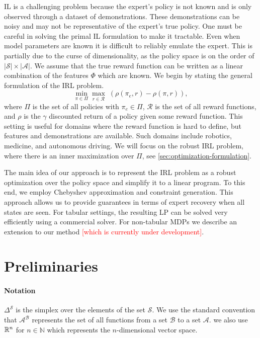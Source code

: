 \documentclass[11pt]{uai2023}
\newcommand{\gersi}[1]{\textcolor{red}{[#1]}}
\begin{document}
IL is a challenging problem because the expert's policy is not known and is only observed through a dataset of demonstrations. 
These demonstrations can be noisy and may not be representative of the expert's true policy. One must be careful in solving the 
primal IL formulation to make it tractable. Even when model parameters are known it is difficult to reliably emulate the expert. 
This is partially due to the curse of dimensionality, as the policy space is on the order of $|\mathcal{S}|\times |\mathcal{A}|$.
We assume that the true reward function can be written as a linear combination of the features $\Phi$ which are known.
We begin by stating the general formulation of the IRL problem.
\begin{equation} \label{eq:IRL_formulation}
	\min_{\pi \in \Pi} \max_{r \in \mathcal{R}} \; (\rho(\pi_e, r) - \rho(\pi, r)),
\end{equation}
where $\Pi$ is the set of all policies with $\pi_e \in \Pi$, $\mathcal{R}$ is the set of all reward functions, and $\rho$ is the $\gamma$ discounted 
return of a policy given some reward function. This setting is useful for domains where the reward function is hard to define, 
but features and demonstrations are available. Such domains include robotics, medicine, and autonomous driving. 
We will focus on the robust IRL problem, where there is an inner maximization over $\Pi$, see \cref{sec:optimization-formulation}.

The main idea of our approach is to represent the IRL problem as a robust optimization over the policy space and simplify it to a linear program. 
To this end, we employ Chebyshev approximation and constraint generation. This approach allows us to provide guarantees in terms of expert recovery when all states are seen.
For tabular settings, the resulting LP can be solved very efficiently using a commercial solver. 
For non-tabular MDPs we describe an extension to our method \gersi{which is currently under development}.

\section{Preliminaries}\label{sec:preliminaries}

\paragraph{Notation} $\Delta^{\mathcal{S}}$ is the simplex over the elements of the set $\mathcal{S}$. We use the standard convention that $\mathcal{A}^{\mathcal{B}}$ represents the set of all functions from a set $\mathcal{B}$ to a set $\mathcal{A}$. we also use $\mathbb{R}^n$ for $n\in \mathbb{N}$ which represents the $n$-dimensional vector space.
\end{document}

